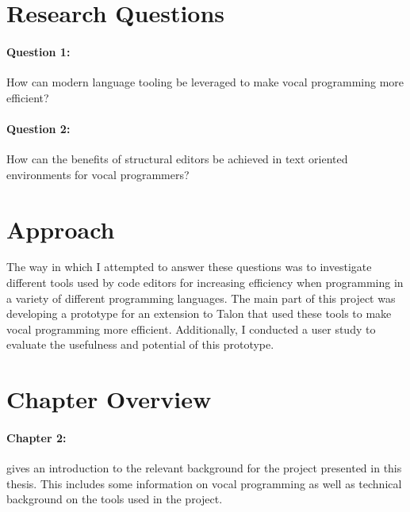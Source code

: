 \documentclass[../thesis.tex]{subfiles}
\begin{document}

\newpage
\section{Research Questions}
\paragraph{Question 1:}
How can modern language tooling be leveraged to make vocal programming more efficient?
\paragraph{Question 2:}
How can the benefits of structural editors be achieved in text oriented environments for vocal programmers?

\section{Approach}
The way in which I attempted to answer these questions was to
investigate different tools used by code editors for increasing efficiency
when programming in a variety of different programming languages.
The main part of this project was developing a prototype for an extension
to Talon that used these tools to make vocal programming more efficient.
Additionally, I conducted a user study to evaluate the usefulness and potential
of this prototype.

\section{Chapter Overview}
\paragraph{Chapter 2: } gives an introduction to the relevant background for the project presented in this thesis.
This includes some information on vocal programming as well as technical background on the tools used in the project.
\end{document}
